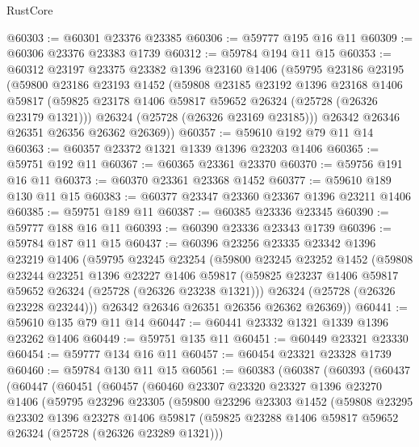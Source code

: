 \begin{lexlean}{RustCore}
\begin{coremodule}
@60303 := @60301 @23376 @23385
@60306 := @59777 @195 @16 @11
@60309 := @60306 @23376 @23383 @1739
@60312 := @59784 @194 @11 @15
@60353 := @60312
    @23197
    @23375
    @23382
    @1396
    @23160
    @1406
    (@59795
      @23186
      @23195
      (@59800
        @23186
        @23193
        @1452
        (@59808
          @23185
          @23192
          @1396
          @23168
          @1406
          @59817
          (@59825 @23178 @1406 @59817 @59652 @26324 (@25728 (@26326 @23179 @1321)))
          @26324
          (@25728 (@26326 @23169 @23185)))
        @26342
        @26346
        @26351
        @26356
        @26362
        @26369))
@60357 := @59610 @192 @79 @11 @14
@60363 := @60357 @23372 @1321 @1339 @1396 @23203 @1406
@60365 := @59751 @192 @11
@60367 := @60365 @23361 @23370
@60370 := @59756 @191 @16 @11
@60373 := @60370 @23361 @23368 @1452
@60377 := @59610 @189 @130 @11 @15
@60383 := @60377 @23347 @23360 @23367 @1396 @23211 @1406
@60385 := @59751 @189 @11
@60387 := @60385 @23336 @23345
@60390 := @59777 @188 @16 @11
@60393 := @60390 @23336 @23343 @1739
@60396 := @59784 @187 @11 @15
@60437 := @60396
    @23256
    @23335
    @23342
    @1396
    @23219
    @1406
    (@59795
      @23245
      @23254
      (@59800
        @23245
        @23252
        @1452
        (@59808
          @23244
          @23251
          @1396
          @23227
          @1406
          @59817
          (@59825 @23237 @1406 @59817 @59652 @26324 (@25728 (@26326 @23238 @1321)))
          @26324
          (@25728 (@26326 @23228 @23244)))
        @26342
        @26346
        @26351
        @26356
        @26362
        @26369))
@60441 := @59610 @135 @79 @11 @14
@60447 := @60441 @23332 @1321 @1339 @1396 @23262 @1406
@60449 := @59751 @135 @11
@60451 := @60449 @23321 @23330
@60454 := @59777 @134 @16 @11
@60457 := @60454 @23321 @23328 @1739
@60460 := @59784 @130 @11 @15
@60561 := @60383
    (@60387
      (@60393
        (@60437
          (@60447
            (@60451
              (@60457
                (@60460
                  @23307
                  @23320
                  @23327
                  @1396
                  @23270
                  @1406
                  (@59795
                    @23296
                    @23305
                    (@59800
                      @23296
                      @23303
                      @1452
                      (@59808
                        @23295
                        @23302
                        @1396
                        @23278
                        @1406
                        @59817
                        (@59825 @23288 @1406 @59817 @59652 @26324 (@25728 (@26326 @23289 @1321)))

\end{coremodule}
\end{lexlean}
